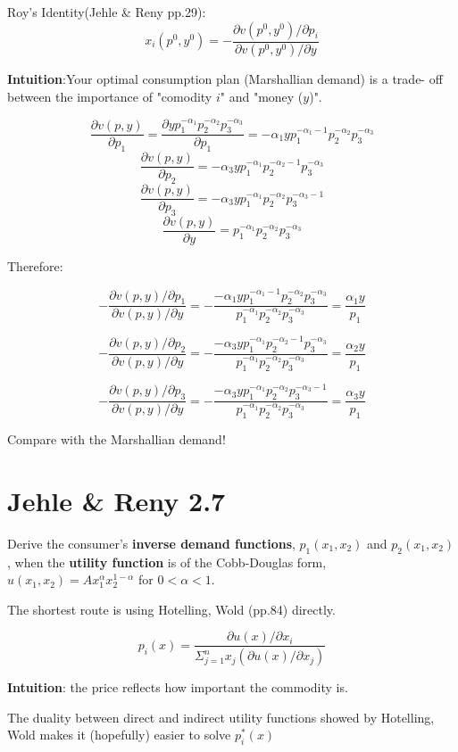 \documentclass{article}
\begin{document}
\begin{mdframed}[backgroundcolor=blue!20,linecolor=white]
Roy's Identity(Jehle \& Reny pp.29): $$x_i(p^0,y^0) = - \frac{\partial v(p^0,y^0) / \partial p_i}{\partial v(p^0,y^0) / \partial y}$$

\textbf{Intuition}:Your optimal consumption plan (Marshallian demand) is a trade- off between the importance of "comodity $i$" and "money ($y$)".

\end{mdframed}

$$\frac{\partial v(p,y)} {\partial p_1} = \frac{\partial yp_1^{-\alpha_1}p_2^{-\alpha_2}p_3^{-\alpha_3}}{\partial p_1} =  -\alpha_1 yp_1^{-\alpha_1 -1}p_2^{-\alpha_2}p_3^{-\alpha_3}$$
$$\frac{\partial v(p,y)} {\partial p_2} =  -\alpha_3 yp_1^{-\alpha_1}p_2^{-\alpha_2-1}p_3^{-\alpha_3}$$
$$\frac{\partial v(p,y)} {\partial p_3} =  -\alpha_3 yp_1^{-\alpha_1}p_2^{-\alpha_2}p_3^{-\alpha_3-1}$$
$$\frac{\partial v(p,y)} {\partial y} = p_1^{-\alpha_1}p_2^{-\alpha_2}p_3^{-\alpha_3}$$

Therefore:

$$-\frac{\partial v(p,y) / \partial p_1}{\partial v(p,y) / \partial y} =-\frac{-\alpha_1 yp_1^{-\alpha_1 -1}p_2^{-\alpha_2}p_3^{-\alpha_3}}{p_1^{-\alpha_1}p_2^{-\alpha_2}p_3^{-\alpha_3}} = \frac{\alpha_1 y}{p_1}$$

$$-\frac{\partial v(p,y) / \partial p_2}{\partial v(p,y) / \partial y} =-\frac{-\alpha_3 yp_1^{-\alpha_1}p_2^{-\alpha_2-1}p_3^{-\alpha_3}}{p_1^{-\alpha_1}p_2^{-\alpha_2}p_3^{-\alpha_3}} = \frac{\alpha_2 y}{p_1}$$

$$-\frac{\partial v(p,y) / \partial p_3}{\partial v(p,y) / \partial y} =-\frac{ -\alpha_3 yp_1^{-\alpha_1}p_2^{-\alpha_2}p_3^{-\alpha_3-1}}{p_1^{-\alpha_1}p_2^{-\alpha_2}p_3^{-\alpha_3}} = \frac{\alpha_3 y}{p_1}$$

Compare with the Marshallian demand!

\section{Jehle \& Reny 2.7}
Derive the consumer's \textbf{inverse demand functions}, $p_1(x_1, x_2)$ and $p_2(x_1, x_2)$, when the \textbf{utility function} is of the Cobb-Douglas form, $u(x_1, x_2) = Ax_1^{\alpha}x_2^{1-\alpha}$ for $0 < \alpha < 1$.

\begin{mdframed}[backgroundcolor=blue!20,linecolor=white]
The shortest route is using Hotelling, Wold (pp.84) directly.

$$p_i(x) = \frac{\partial u(x) / \partial x_i}{\Sigma^{n}_{j=1} x_j( \partial u(x) / \partial x_j)}$$

\textbf{Intuition}: the price reflects how important the commodity is.

\vspace{3mm}


The duality between direct and indirect utility functions showed by Hotelling, Wold makes it (hopefully) easier to solve $p_i^*(x)$
\end{mdframed}
\end{document}
